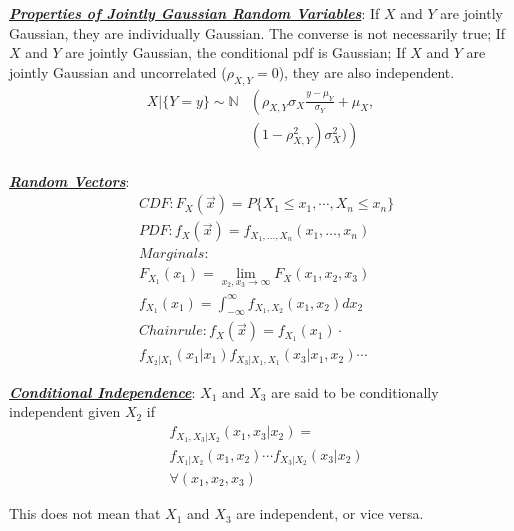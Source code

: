 \documentclass[12pt]{article}
\newcommand{\bulletPoint}[1]{\ul{\textit{\textbf{#1}}}}
\begin{document}
\begin{multicols*}{4}
\bulletPoint{Properties of Jointly Gaussian Random Variables}:
If $X$ and $Y$ are jointly Gaussian, they are individually Gaussian. The converse is not necessarily true; If $X$ and $Y$ are jointly Gaussian, the conditional pdf is Gaussian; If $X$ and $Y$ are jointly Gaussian and uncorrelated ($\rho_{X,Y}=0$), they are also independent.
\useshortskip \begin{equation*}
\begin{split}
 X|\{Y=y\} \sim \mathbb{N}&\left( \rho_{X,Y}\sigma_X\frac{y-\mu_Y}{\sigma_Y}+\mu_X,\right.\\
&\left. (1-\rho^2_{X,Y})\sigma^2_X ) \right)\\[-8pt]
\end{split}
\end{equation*}


\bulletPoint{Random Vectors}:
\useshortskip \begin{equation*}
    \begin{split}
        & CDF: F_X(\Vec{x}) = P\{X_1 \leq x_1, \cdots, X_n \leq x_n\}\\
        & PDF: f_X(\Vec{x}) = f_{X_1, \ldots, X_n}(x_1, \ldots, x_n)\\
        & Marginals: \\
        & F_{X_1}(x_1) = \lim_{x_2, x_3 \rightarrow \infty}F_{X}(x_1, x_2, x_3)\\
        & f_{X_1}(x_1) = \int^\infty_{-\infty}f_{X_1,X_2}(x_1,x_2)dx_2\\
        & Chain rule: f_X(\Vec{x}) = f_{X_1}(x_1)\cdot\\
        & f_{X_2|X_1}(x_1|x_1)f_{X_3|X_1,X_1}(x_3|x_1, x_2)\cdots
    \end{split}
\end{equation*}


\bulletPoint{Conditional Independence}:
$X_1$ and $X_3$ are said to be conditionally independent given $X_2$ if 
\useshortskip \begin{equation*}
    \begin{split}
        & f_{X_1,X_3|X_2}(x_1,x_3|x_2) = \\
        & f_{X_1|X_2}(x_1,x_2)\cdots f_{X_3|X_2}(x_3|x_2) \\ 
        & \forall(x_1,x_2,x_3)
    \end{split}
\end{equation*}

This does not mean that $X_1$ and $X_3$ are independent, or vice versa.



\end{multicols*}
\end{document}
